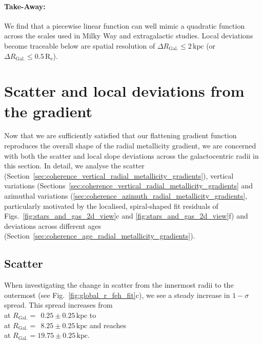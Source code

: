 \documentclass[twocolumn,apj,numberedappendix,appendixfloats]{openjournal}
\begin{document}
\begin{CJK*}{UTF8}{gbsn}
\paragraph*{Take-Away:} We find that a piecewise linear function can well mimic a quadratic function across the scales used in Milky Way and extragalactic studies. Local deviations become traceable below are spatial resolution of $\Delta R_\mathrm{Gal.} \leq 2\,\mathrm{kpc}$ (or $\Delta R_\mathrm{Gal.} \leq 0.5\,\mathrm{R_e}$).

\section{Scatter and local deviations from the gradient}
\label{sec:scatter_radial_metallicity_gradients}

Now that we are sufficiently satisfied that our flattening gradient function reproduces the overall shape of the radial metallicity gradient, we are concerned with both the scatter and local slope deviations across the galactocentric radii in this section. In detail, we analyse the scatter (Section~\ref{sec:coherence_vertical_radial_metallicity_gradients}), vertical variations (Sections~\ref{sec:coherence_vertical_radial_metallicity_gradients} and azimuthal variations (\ref{sec:coherence_azimuth_radial_metallicity_gradients}, particularly motivated by the localised, spiral-shaped fit residuals of Figs.~\ref{fig:stars_and_gas_2d_view}c and \ref{fig:stars_and_gas_2d_view}f) and deviations across different ages (Section~\ref{sec:coherence_age_radial_metallicity_gradients}).

\subsection{Scatter}
\label{sec:scatter}

When investigating the change in scatter from the innermost radii to the outermost (see Fig.~\ref{fig:global_r_feh_fit}c), we see a steady increase in $1-\sigma$ spread. This spread increases from \\
 at $R_\mathrm{Gal.} = ~~0.25 \pm 0.25\,\mathrm{kpc}$ to \\
 at $R_\mathrm{Gal.} = ~~8.25 \pm 0.25\,\mathrm{kpc}$ and reaches \\
 at $R_\mathrm{Gal.} = 19.75 \pm 0.25\,\mathrm{kpc}$.


\end{CJK*}
\end{document}

